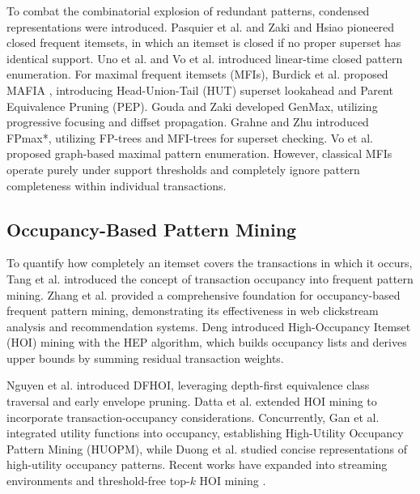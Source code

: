 \documentclass[runningheads,orivec]{llncs}
\begin{document}
To combat the combinatorial explosion of redundant patterns, condensed representations were introduced. Pasquier et al. \cite{pasquier1999discovering} and Zaki and Hsiao \cite{zaki2002charm} pioneered closed frequent itemsets, in which an itemset is closed if no proper superset has identical support. Uno et al. \cite{uno2003lcm} and Vo et al. \cite{vo2015nlist} introduced linear-time closed pattern enumeration. For maximal frequent itemsets (MFIs), Burdick et al. proposed MAFIA \cite{burdick2001mafia,burdick2005mafia}, introducing Head-Union-Tail (HUT) superset lookahead and Parent Equivalence Pruning (PEP). Gouda and Zaki \cite{gouda2005genmax} developed GenMax, utilizing progressive focusing and diffset propagation. Grahne and Zhu \cite{grahne2005fast} introduced FPmax*, utilizing FP-trees and MFI-trees for superset checking. Vo et al. \cite{vo2017novel} proposed graph-based maximal pattern enumeration. However, classical MFIs operate purely under support thresholds and completely ignore pattern completeness within individual transactions.

\subsection{Occupancy-Based Pattern Mining}
To quantify how completely an itemset covers the transactions in which it occurs, Tang et al. \cite{tang2012incorporating} introduced the concept of transaction occupancy into frequent pattern mining. Zhang et al. \cite{zhang2015occupancy} provided a comprehensive foundation for occupancy-based frequent pattern mining, demonstrating its effectiveness in web clickstream analysis and recommendation systems. Deng \cite{deng2020mining} introduced High-Occupancy Itemset (HOI) mining with the \textsc{HEP} algorithm, which builds occupancy lists and derives upper bounds by summing residual transaction weights.

Nguyen et al. \cite{nguyen2023efficient} introduced \textsc{DFHOI}, leveraging depth-first equivalence class traversal and early envelope pruning. Datta et al. \cite{datta2022high} extended HOI mining to incorporate transaction-occupancy considerations. Concurrently, Gan et al. \cite{gan2020huopm} integrated utility functions into occupancy, establishing High-Utility Occupancy Pattern Mining (HUOPM), while Duong et al. \cite{duong2024efficient} studied concise representations of high-utility occupancy patterns. Recent works have expanded into streaming environments \cite{cho2026damped,park2025sliding} and threshold-free top-$k$ HOI mining \cite{ngo2026efficient}. 
\end{document}
